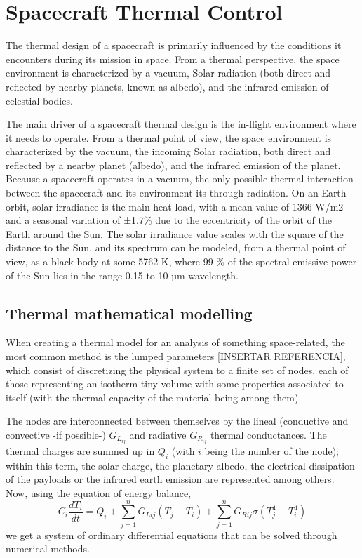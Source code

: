 \section{Spacecraft Thermal Control}

The thermal design of a spacecraft is primarily influenced by the conditions it encounters during its mission in space. From a thermal perspective, the space environment is characterized by a vacuum, Solar radiation (both direct and reflected by nearby planets, known as albedo), and the infrared emission of celestial bodies.

The main driver of a spacecraft thermal design is the in-flight environment where it needs to operate. From a thermal point of view, the space environment is characterized by the vacuum, the incoming Solar radiation, both direct and reflected by a nearby planet (albedo), and the infrared
emission of the planet. Because a spacecraft operates in a vacuum, the only possible thermal interaction between the spacecraft and its environment its through radiation. On an Earth orbit, solar irradiance is the main heat load, with a mean value of 1366 W/m2 and a seasonal variation of ±1.7\% due to the eccentricity of the orbit of the Earth around the Sun. The solar irradiance value scales with the square of the distance to the Sun, and its spectrum can be modeled, from a thermal point of view, as a black body at some 5762 K, where 99 \% of the spectral emissive power of the Sun lies in the range 0.15 to 10 µm wavelength.

\subsection{Thermal mathematical modelling}
When creating a thermal model for an analysis of something space-related, the most common method is the lumped parameters [INSERTAR REFERENCIA], which consist of discretizing the physical system to a finite set of nodes, each of those representing an isotherm tiny volume with some properties associated to itself (with the thermal capacity of the material being among them). 

The nodes are interconnected between themselves by the lineal (conductive and convective -if possible-) $G_{L_{ij}}$ and radiative $G_{R_{ij}}$ thermal conductances. The thermal charges are summed up in $Q_i$ (with $i$ being the number of the node); within this term, the solar charge, the planetary albedo, the electrical dissipation of the payloads or the infrared earth emission are represented among others. Now, using the equation of energy balance,
\begin{equation}C_i\frac{dT_i}{dt}=Q_i+\sum_{j=1}^nG_{Lij}\left(T_j-T_i\right)+\sum_{j=1}^nG_{Rij}\sigma\left(T_j^4-T_i^4\right)
\label{eq: balance}
\end{equation}
we get a system of ordinary differential equations that can be solved through numerical methods.

